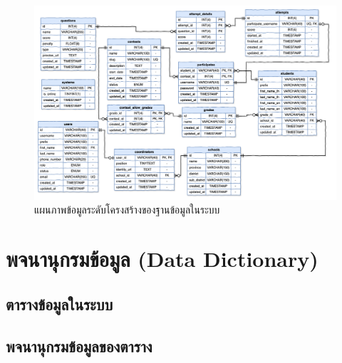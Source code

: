 \begin{figure}[H]
    \centering
    \includegraphics[width=120mm,scale=1.0]{diagrams/database.png}
    \caption{แผนภาพข้อมูลระดับโครงสร้างของฐานข้อมูลในระบบ}
    \label{fig:physical-database-diagram}
\end{figure}

\newpage

\section{พจนานุกรมข้อมูล (Data Dictionary)}

\subsection{ตารางข้อมูลในระบบ}


\subsection{พจนานุกรมข้อมูลของตาราง}














